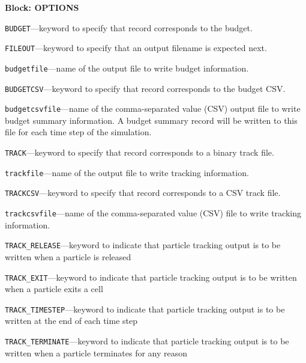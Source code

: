 
\item \textbf{Block: OPTIONS}

\begin{description}
\item \texttt{BUDGET}---keyword to specify that record corresponds to the budget.

\item \texttt{FILEOUT}---keyword to specify that an output filename is expected next.

\item \texttt{budgetfile}---name of the output file to write budget information.

\item \texttt{BUDGETCSV}---keyword to specify that record corresponds to the budget CSV.

\item \texttt{budgetcsvfile}---name of the comma-separated value (CSV) output file to write budget summary information.  A budget summary record will be written to this file for each time step of the simulation.

\item \texttt{TRACK}---keyword to specify that record corresponds to a binary track file.

\item \texttt{trackfile}---name of the output file to write tracking information.

\item \texttt{TRACKCSV}---keyword to specify that record corresponds to a CSV track file.

\item \texttt{trackcsvfile}---name of the comma-separated value (CSV) file to write tracking information.

\item \texttt{TRACK\_RELEASE}---keyword to indicate that particle tracking output is to be written when a particle is released

\item \texttt{TRACK\_EXIT}---keyword to indicate that particle tracking output is to be written when a particle exits a cell

\item \texttt{TRACK\_TIMESTEP}---keyword to indicate that particle tracking output is to be written at the end of each time step

\item \texttt{TRACK\_TERMINATE}---keyword to indicate that particle tracking output is to be written when a particle terminates for any reason


\end{description}
